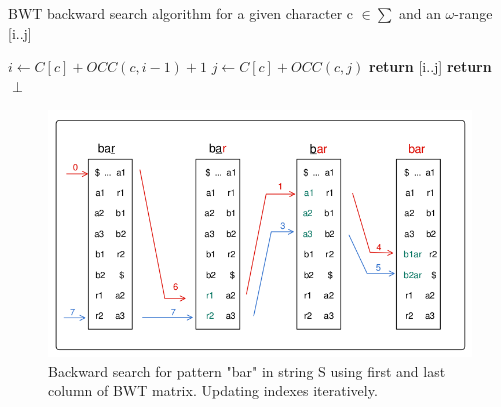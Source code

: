 \documentclass[11pt,a4paper]{report}
\begin{document}

     



\begin{algorithm}[H]
   \caption{BWT backward search algorithm for a 
   given character c $\in \sum $ and an 
   $\omega$-range [i..j]}
   
    \begin{algorithmic}[1]
       	\State ${i \leftarrow C[c] + OCC(c, i-1)+1}$
        \State ${j \leftarrow C[c] + OCC(c,j)}$
        		\State \textbf{return} [i..j]
        	\Else
        		\State \textbf{return} $\perp$
        	\EndIf 
    \EndFunction

	\end{algorithmic}
  \label{backward search alg}	
\end{algorithm}




\begin{figure}[H]
\centering
\includegraphics[width=12cm]{pictures/bar_1.png}
\caption{Backward search for pattern "bar" in 
string S using first and 
last column of BWT matrix. Updating indexes 
iteratively.}
\label{backwardSearch}
\end{figure}
\end{document}
